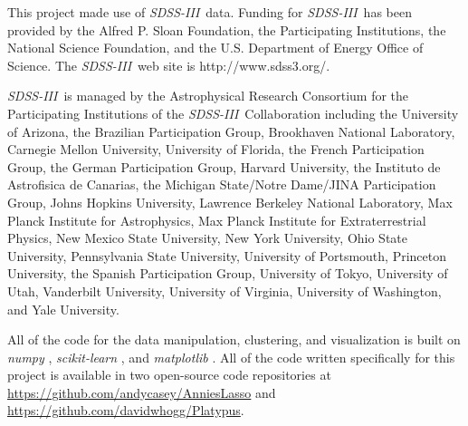 \documentclass[12pt, letterpaper, preprint]{aastex}
\newcommand{\acronym}[1]{{\small{#1}}}
\newcommand{\project}[1]{\textsl{#1}}
\newcommand{\sdssiii}{\project{\acronym{SDSS-III}}}
\begin{document}
This project made use of \sdssiii\ data.
Funding for \sdssiii\ has been provided by the Alfred P. Sloan
Foundation, the Participating Institutions, the National Science
Foundation, and the \acronym{U.S.} Department of Energy Office of Science. The
\sdssiii\ web site is http://www.sdss3.org/.

\sdssiii\ is managed by the Astrophysical Research Consortium for the
Participating Institutions of the \sdssiii\ Collaboration including the
University of Arizona, the Brazilian Participation Group, Brookhaven
National Laboratory, Carnegie Mellon University, University of
Florida, the French Participation Group, the German Participation
Group, Harvard University, the Instituto de Astrofisica de Canarias,
the Michigan State/Notre Dame/\acronym{JINA} Participation Group, Johns Hopkins
University, Lawrence Berkeley National Laboratory, Max Planck
Institute for Astrophysics, Max Planck Institute for Extraterrestrial
Physics, New Mexico State University, New York University, Ohio State
University, Pennsylvania State University, University of Portsmouth,
Princeton University, the Spanish Participation Group, University of
Tokyo, University of Utah, Vanderbilt University, University of
Virginia, University of Washington, and Yale University.

All of the code for the data manipulation, clustering, and
visualization is built on \project{numpy} \citep{numpy},
\project{scikit-learn} \citep{sklearn}, and \project{matplotlib}
\citep{matplotlib}.
All of the code written specifically for this project is available in
two open-source code repositories at
\url{https://github.com/andycasey/AnniesLasso} and
\url{https://github.com/davidwhogg/Platypus}.
\end{document}
